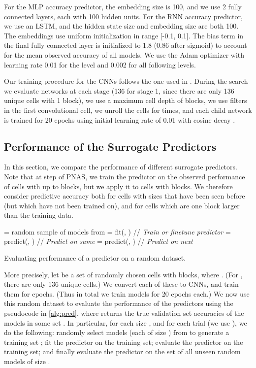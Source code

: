 \documentclass[runningheads]{llncs}
\begin{document}
For the MLP accuracy predictor, the embedding size is 100,
and we use 2 fully connected layers, each with 100 hidden units.
For the RNN accuracy predictor, we use an LSTM, 
and the hidden state size and embedding size are both 100.
The embeddings use uniform initialization in range [-0.1, 0.1].
The bias term in the final fully connected layer is initialized to 1.8 (0.86 after sigmoid) to account for the mean observed accuracy of all  models.
We use the Adam optimizer \cite{DBLP:journals/corr/KingmaB14} with learning rate 0.01 for the  level and 0.002 for all following levels.


Our training procedure for the CNNs follows the one used in
 \cite{DBLP:journals/corr/ZophVSL17}.
 During the search we evaluate  networks at each stage
 (136 for stage 1, since there are only 136 unique cells with 1 block),
we use a maximum cell depth of  blocks,
we use   filters in the first convolutional cell,
we unroll the cells for  times,
and each child network is trained for 20 epochs using initial learning rate of 0.01 with cosine decay \cite{DBLP:journals/corr/LoshchilovH16a}.
 
\subsection{Performance of the Surrogate Predictors}
\label{sec:predictor}

In this section, we compare the performance of different surrogate predictors.
Note that at step  of PNAS, we train the predictor
on the observed performance of cells with up to  blocks,
but we apply it to cells with  blocks.
We therefore consider predictive accuracy both for cells with sizes that have been seen before
(but which have not been trained on),
and for cells which are one block larger than the training data.


\newcommand{\loss}[1]{L(#1)}
\newcommand{\acc}[1]{A(#1)}

\begin{algorithm}[b]
\begin{algorithmic}
\FOR{}
\FOR{}
\STATE  = random sample of  models from 
\STATE  = fit(, ) // {\it Train or finetune predictor}
\STATE  = predict(, ) // {\it Predict on same }
\STATE  = predict(, ) // {\it Predict on next }
\ENDFOR
\ENDFOR
\end{algorithmic}
\caption{Evaluating performance of a predictor  on a random dataset.
}
\label{alg:pred}
\end{algorithm}


More precisely, let  be a set of randomly chosen cells with  blocks,
where .
(For , there are only 136 unique cells.)
We convert each of these to CNNs, and  train them for  epochs.
(Thus in total we train  models for 20 epochs each.)
We now use this random dataset to evaluate the performance of the predictors
using the pseudocode in \cref{alg:pred},
where  returns the true validation set accuracies of the models in some set .
In particular, for each size , and for each trial  (we use ),
we do the following:
randomly select  models (each of size )  from  to generate
a training set ;
fit the predictor on the training set;
evaluate the predictor on the training set;
and finally 
evaluate the predictor on the set of all unseen random models of size .
\end{document}
